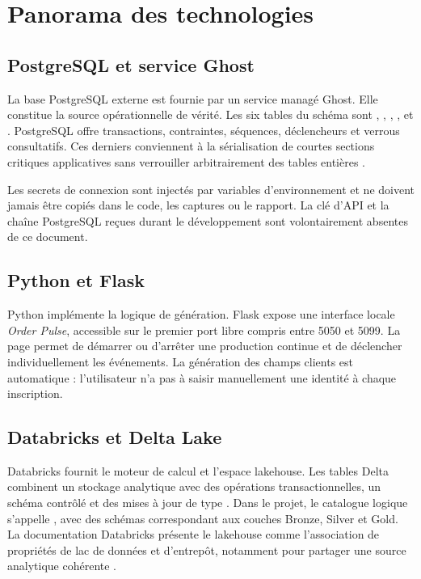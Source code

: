 \section{Panorama des technologies}

\subsection{PostgreSQL et service Ghost}
La base PostgreSQL externe est fournie par un service managé Ghost. Elle constitue la source opérationnelle de vérité. Les six tables du schéma  sont , , , ,  et . PostgreSQL offre transactions, contraintes, séquences, déclencheurs et verrous consultatifs. Ces derniers conviennent à la sérialisation de courtes sections critiques applicatives sans verrouiller arbitrairement des tables entières \cite{postgres-locks}.

Les secrets de connexion sont injectés par variables d'environnement et ne doivent jamais être copiés dans le code, les captures ou le rapport. La clé d'API et la chaîne PostgreSQL reçues durant le développement sont volontairement absentes de ce document.

\subsection{Python et Flask}
Python implémente la logique de génération. Flask expose une interface locale \emph{Order Pulse}, accessible sur le premier port libre compris entre 5050 et 5099. La page permet de démarrer ou d'arrêter une production continue et de déclencher individuellement les événements. La génération des champs clients est automatique : l'utilisateur n'a pas à saisir manuellement une identité à chaque inscription.

\subsection{Databricks et Delta Lake}
Databricks fournit le moteur de calcul et l'espace lakehouse. Les tables Delta combinent un stockage analytique avec des opérations transactionnelles, un schéma contrôlé et des mises à jour de type . Dans le projet, le catalogue logique s'appelle , avec des schémas correspondant aux couches Bronze, Silver et Gold. La documentation Databricks présente le lakehouse comme l'association de propriétés de lac de données et d'entrepôt, notamment pour partager une source analytique cohérente \cite{databricks-lakehouse}.

